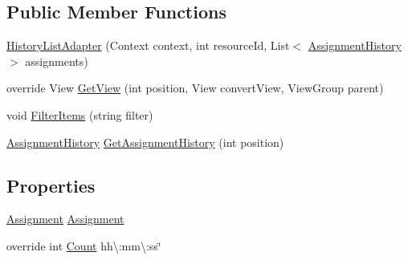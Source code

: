 \subsection*{Public Member Functions}
\begin{DoxyCompactItemize}
\item 
\hyperlink{class_field_service_1_1_android_1_1_adapters_1_1_history_list_adapter_a8e6ddd6fd257d9e62735cd61db9ba1cf}{History\+List\+Adapter} (Context context, int resource\+Id, List$<$ \hyperlink{class_field_service_1_1_data_1_1_assignment_history}{Assignment\+History} $>$ assignments)
\item 
override View \hyperlink{class_field_service_1_1_android_1_1_adapters_1_1_history_list_adapter_aaf4f6d37ea7dcc70653e852d70dda325}{Get\+View} (int position, View convert\+View, View\+Group parent)
\item 
void \hyperlink{class_field_service_1_1_android_1_1_adapters_1_1_history_list_adapter_ac25dcbddede9a2ec9ff229e5f241e8d2}{Filter\+Items} (string filter)
\item 
\hyperlink{class_field_service_1_1_data_1_1_assignment_history}{Assignment\+History} \hyperlink{class_field_service_1_1_android_1_1_adapters_1_1_history_list_adapter_a00bdf7698dfe62c0da91b6f504978bfc}{Get\+Assignment\+History} (int position)
\end{DoxyCompactItemize}
\subsection*{Properties}
\begin{DoxyCompactItemize}
\item 
\hyperlink{class_field_service_1_1_data_1_1_assignment}{Assignment} \hyperlink{class_field_service_1_1_android_1_1_adapters_1_1_history_list_adapter_a5eb165ed9d002384af0009445e3648ac}{Assignment}
\item 
override int \hyperlink{class_field_service_1_1_android_1_1_adapters_1_1_history_list_adapter_a496b8e151dd68cf51e73decfd8eae66d}{Count} hh\textbackslash{}\+:mm\textbackslash{}\+:ss\char`\"{}
\end{DoxyCompactItemize}


